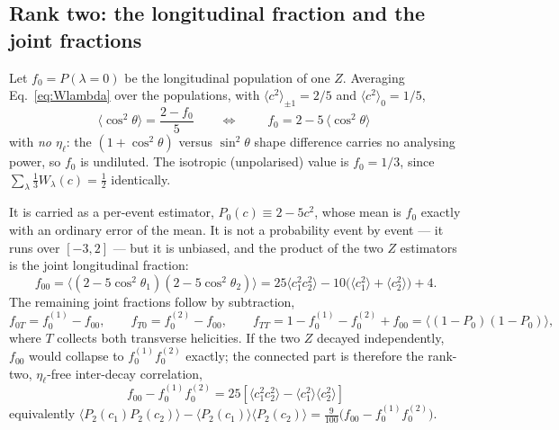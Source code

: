 \documentclass[a4paper,11pt]{article}
\providecommand{\etal}{\ensuremath{\eta_\ell}}          %
\begin{document}
\subsection{Rank two: the longitudinal fraction and the joint fractions}
\label{subsec:spinobs_f0}

Let $f_0=P(\lambda=0)$ be the longitudinal population of one $Z$. Averaging
Eq.~\eqref{eq:Wlambda} over the populations, with
$\langle c^2\rangle_{\pm1}=2/5$ and $\langle c^2\rangle_0=1/5$,
\begin{equation}
  \langle\cos^2\theta\rangle=\frac{2-f_0}{5}
  \qquad\Longleftrightarrow\qquad
  \boxed{\;f_0=2-5\,\langle\cos^2\theta\rangle\;}
  \label{eq:f0}
\end{equation}
with \emph{no $\etal$}: the $(1+\cos^2\theta)$ versus $\sin^2\theta$ shape
difference carries no analysing power, so $f_0$ is undiluted. The isotropic
(unpolarised) value is $f_0=1/3$, since
$\sum_\lambda\frac13W_\lambda(c)=\frac12$ identically.

It is carried as a per-event estimator, $P_0(c)\equiv2-5c^2$, whose mean is
$f_0$ exactly with an ordinary error of the mean. It is not a probability event
by event --- it runs over $[-3,2]$ --- but it is unbiased, and the product of
the two $Z$ estimators is the joint longitudinal fraction:
\begin{equation}
  f_{00}=\big\langle(2-5\cos^2\theta_1)(2-5\cos^2\theta_2)\big\rangle
        =25\langle c_1^2c_2^2\rangle-10\big(\langle c_1^2\rangle+\langle c_2^2\rangle\big)+4 .
  \label{eq:f00}
\end{equation}
The remaining joint fractions follow by subtraction,
\begin{equation}
  f_{0T}=f_0^{(1)}-f_{00},\qquad
  f_{T0}=f_0^{(2)}-f_{00},\qquad
  f_{TT}=1-f_0^{(1)}-f_0^{(2)}+f_{00}=\big\langle(1-P_0)(1-P_0)\big\rangle,
  \label{eq:fjoint}
\end{equation}
where $T$ collects both transverse helicities. If the two $Z$ decayed
independently, $f_{00}$ would collapse to $f_0^{(1)}f_0^{(2)}$ exactly; the
connected part is therefore the rank-two, $\etal$-free inter-decay correlation,
\begin{equation}
  \boxed{\;f_{00}-f_0^{(1)}f_0^{(2)}=25\left[\langle c_1^2c_2^2\rangle-\langle c_1^2\rangle\langle c_2^2\rangle\right]\;}
  \label{eq:rank2corr}
\end{equation}
equivalently $\langle P_2(c_1)P_2(c_2)\rangle-\langle P_2(c_1)\rangle\langle
P_2(c_2)\rangle=\frac{9}{100}\big(f_{00}-f_0^{(1)}f_0^{(2)}\big)$.
\end{document}
